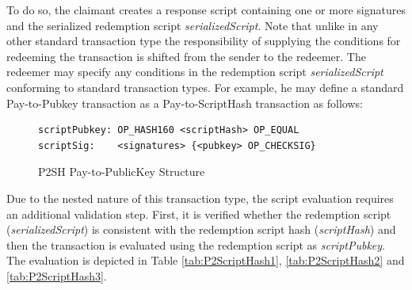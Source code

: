 \noindent
To do so, the claimant creates a response script containing one or more signatures and the serialized redemption script \textit{serializedScript}. Note that unlike in any other standard transaction type the responsibility of supplying the conditions for redeeming the transaction is shifted from the sender to the redeemer. The redeemer may specify any conditions in the redemption script \textit{serializedScript} conforming to standard transaction types. For example, he may define a standard Pay-to-Pubkey transaction as a Pay-to-ScriptHash transaction as follows:

\vspace{-10pt}
\begin{figure}[htbp]

\begin{Verbatim}[fontsize==\relsize{-4}, frame=single]  
scriptPubkey: OP_HASH160 <scriptHash> OP_EQUAL
scriptSig:    <signatures> {<pubkey> OP_CHECKSIG}
\end{Verbatim}

\vspace{-15pt}
\caption{P2SH Pay-to-PublicKey Structure}
\label{fig:P2ScriptHashStructure-P2PK}
\end{figure}
\vspace{-10pt}

\noindent
Due to the nested nature of this transaction type, the script evaluation requires an additional validation step. First, it is verified whether the redemption script (\textit{serializedScript}) is consistent with the redemption script hash (\textit{scriptHash}) and then the transaction is evaluated using the redemption script as \textit{scriptPubkey}. The evaluation is depicted in Table \ref{tab:P2ScriptHash1}, \ref{tab:P2ScriptHash2} and \ref{tab:P2ScriptHash3}.

\clearpage

